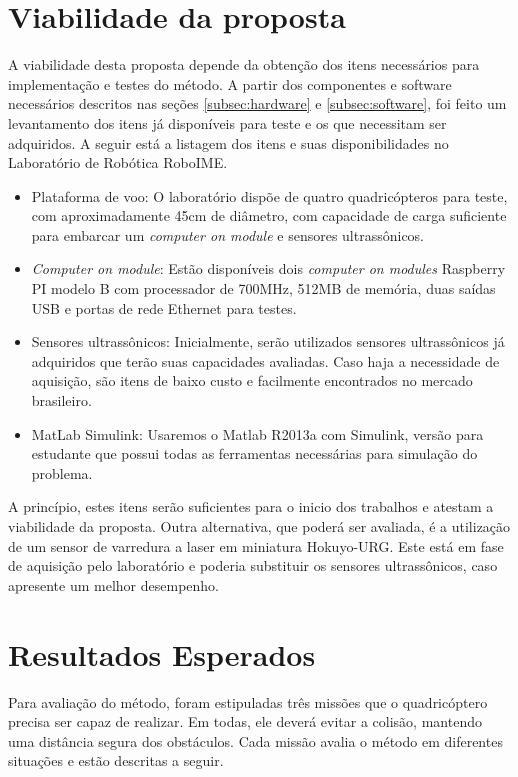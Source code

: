 \documentclass[a4paper, 12pt]{article}
\begin{document}
\newpage

\section{Viabilidade da proposta}
\label{sec:viabilidade}

A viabilidade desta proposta depende da obtenção dos itens necessários para implementação e testes do método. A partir dos componentes e software necessários descritos nas seções \ref{subsec:hardware} e \ref{subsec:software}, foi feito um levantamento dos itens já disponíveis para teste e os que necessitam ser adquiridos. A seguir está a listagem dos itens e suas disponibilidades no Laboratório de Robótica RoboIME.

\begin{itemize}
	\item
	Plataforma de voo:  O laboratório dispõe de quatro quadricópteros para teste, com aproximadamente 45cm de diâmetro, com capacidade de carga suficiente para embarcar um \textit{computer on module} e sensores ultrassônicos.
	\item
	\textit{Computer on module}: Estão disponíveis dois \textit{computer on modules} Raspberry PI modelo B com processador de 700MHz, 512MB de memória, duas saídas USB e portas de rede Ethernet para testes.
	\item
	Sensores ultrassônicos: Inicialmente, serão utilizados sensores ultrassônicos já adquiridos que terão suas capacidades avaliadas. Caso haja a necessidade de aquisição, são itens de baixo custo e facilmente encontrados no mercado brasileiro.
	\item
	MatLab Simulink: Usaremos o Matlab R2013a com Simulink, versão para estudante que possui todas as ferramentas necessárias para simulação do problema. 

\end{itemize}

A princípio, estes itens serão suficientes para o inicio dos trabalhos e atestam a viabilidade da proposta. Outra alternativa, que poderá ser avaliada, é a utilização de um sensor de varredura a laser em miniatura Hokuyo-URG. Este está em fase de aquisição pelo laboratório e poderia substituir os sensores ultrassônicos, caso apresente um melhor desempenho.

\newpage

\section{Resultados Esperados}
\label{sec:resultados}
 Para avaliação do método, foram estipuladas três missões que o quadricóptero precisa ser capaz de realizar. Em todas, ele deverá evitar a colisão, mantendo uma distância segura dos obstáculos. Cada missão avalia o método em diferentes situações e estão descritas a seguir.
 
\end{document}
